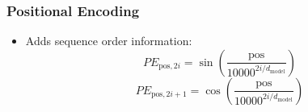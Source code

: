 \subsubsection{Positional Encoding}
\begin{itemize}
    \item Adds sequence order information:
    \[
    PE_{\text{pos}, 2i} = \sin\left(\frac{\text{pos}}{10000^{2i/d_{\text{model}}}}\right)
    \]
    \[
    PE_{\text{pos}, 2i+1} = \cos\left(\frac{\text{pos}}{10000^{2i/d_{\text{model}}}}\right)
    \]
\end{itemize}